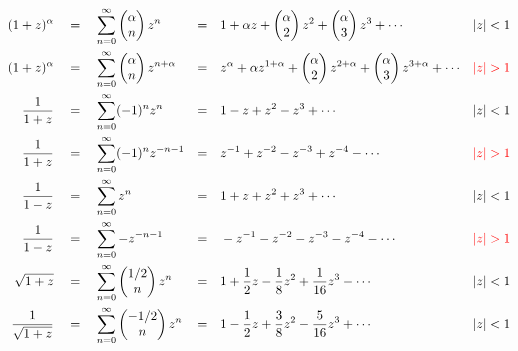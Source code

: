 \documentclass[main.tex]{subfiles}
\begin{document}
\begin{align*}
    (1+z)^{\alpha} \quad&=\quad \sum_{n=0}^{\infty} \begin{pmatrix}\alpha\\n\end{pmatrix}z^n &=&\quad 1+\alpha z+\begin{pmatrix}\alpha\\2\end{pmatrix}z^2+\begin{pmatrix}\alpha\\3\end{pmatrix}z^3+\cdots & |z|<1 \\
    (1+z)^{\alpha} \quad&=\quad \sum_{n=0}^{\infty} \begin{pmatrix}\alpha\\n\end{pmatrix}z^{n+\alpha} &=&\quad z^{\alpha}+\alpha z^{1+\alpha}+\begin{pmatrix}\alpha\\2\end{pmatrix}z^{2+\alpha}+\begin{pmatrix}\alpha\\3\end{pmatrix}z^{3+\alpha}+\cdots & {\color{red}|z|>1} \\
    \frac{1}{1+z} \quad&=\quad \sum_{n=0}^{\infty}(-1)^nz^n &=&\quad 1-z+z^2-z^3+\cdots & |z|<1 \\
    \frac{1}{1+z} \quad&=\quad \sum_{n=0}^{\infty}(-1)^nz^{-n-1} &=&\quad z^{-1}+z^{-2}-z^{-3}+z^{-4}-\cdots & {\color{red}|z|>1} \\
    \frac{1}{1-z} \quad&=\quad \sum_{n=0}^{\infty}z^n &=&\quad 1+z+z^2+z^3+\cdots & |z|<1 \\
    \frac{1}{1-z} \quad&=\quad \sum_{n=0}^{\infty}-z^{-n-1} &=&\quad -z^{-1}-z^{-2}-z^{-3}-z^{-4}-\cdots & {\color{red}|z|>1} \\
    \sqrt{1+z} \quad&=\quad \sum_{n=0}^{\infty}\begin{pmatrix}1/2\\n\end{pmatrix}z^n &=&\quad 1+\frac{1}{2}z-\frac{1}{8}z^2+\frac{1}{16}z^3-\cdots & |z|<1\\
    \frac{1}{\sqrt{1+z}} \quad&=\quad \sum_{n=0}^{\infty}\begin{pmatrix}-1/2\\n\end{pmatrix}z^n &=&\quad 1-\frac{1}{2}z+\frac{3}{8}z^2-\frac{5}{16}z^3+\cdots & |z|<1
\end{align*}
\end{document}
